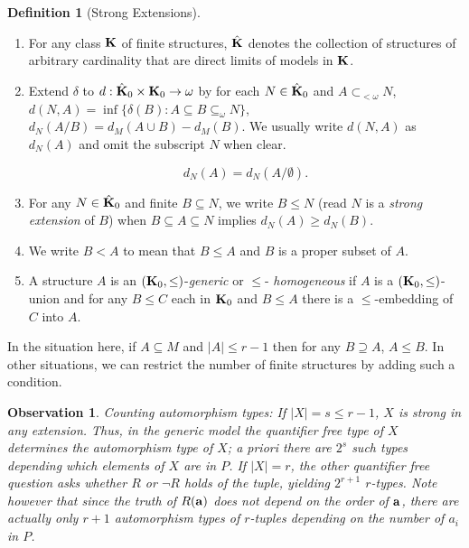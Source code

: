 \documentclass[11pt]{amsart}
\def\bK{{\bf K}}
\def\bL{{\bf L}}
\def\abar{{\bf a}}
\newtheorem{observation}[theorem]{Observation}
\theoremstyle{definition}
\newtheorem{definition}[theorem]{Definition}
\theoremstyle{remark}
\numberwithin{equation}{section}
\begin{document}



\begin{definition}[Strong Extensions]\label{stext}
\begin{enumerate}
\item For any class $\bK$ of finite structures, $\hat \bK$ denotes the
    collection of structures of arbitrary cardinality that are direct
    limits of models in $\bK$.

    \item Extend $\delta$ to $d: { \hat \bK}_0 \times {\bK_0} \rightarrow
        \omega$ by for each $N \in {\hat \bK}_0$ and $A \subset_{<\omega}
N$, $d(N,A) = \inf \{\delta(B): A \subseteq B \subseteq_{\omega} N\}$,
$d_N(A/B) = d_M(A \cup B) -d_M(B)$. We usually write $d(N,A)$ as $d_N(A)$
and omit the subscript $N$ when clear.

%

    \[d_N(A) = d_N(A/\emptyset).\]
    \item For any $N \in \hat\bK_0$ and finite  $B \subseteq N$, we write
        $B \leq N$ (read $N$ is a \emph{ strong extension} of $B$) when  $B
        \subseteq A\subseteq N$ implies $d_N(A) \geq d_N(B)$.

\item We write $B < A$ to mean that $B \leq A$ and $B$ is a proper subset
    of $A$.

  \item A structure $A$ is an $(\bK_0, \leq)$-{\em generic} or $\leq$-{\em
      homogeneous} if $A$ is a $(\bK_0, \leq)$-union and for any $B\leq C$
      each in $\bK_0$ and $B\leq A$ there is a $\leq$-embedding of $C$ into
      $A$.
\end{enumerate}
\end{definition}

In the situation here, if $A
    \subseteq M$ and $|A| \leq r-1$ then for any $B \supseteq A$, $A\leq
    B$.  In other situations, we can restrict the number of  finite structures by adding
    such a
    condition.

\begin{observation} Counting automorphism types: {\rm If $|X| = s \leq r-1$, $X$ is strong
 in any extension. Thus,
in the generic model the quantifier free type  of $X$  determines  the
automorphism type of $X$; {\em a priori} there are $2^s$ such types depending
which elements of $X$ are in $P$. If $|X| =r$, the other quantifier free
question asks whether $R$ or $\neg R$ holds of the tuple, yielding $2^{r+1}$
$r$-types. Note however that since the truth of $R(\abar)$ does not depend on
the order of $\abar$, there are actually only $r+1$ automorphism types of
$r$-tuples depending on the number of $a_i$ in $P$.}
\end{observation}
\end{document}
